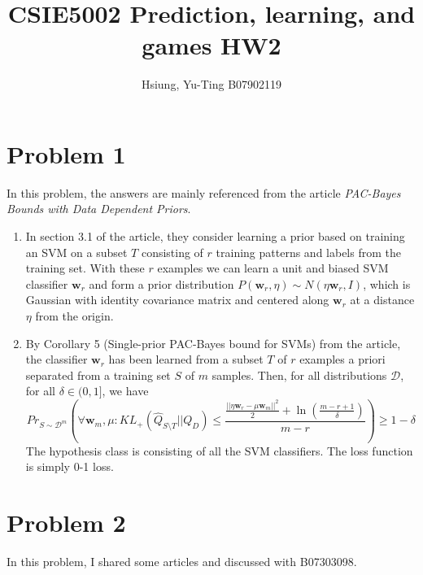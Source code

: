 \documentclass[a4paper, 12pt]{article}
\title{CSIE5002 Prediction, learning, and games HW2}
\author{Hsiung, Yu-Ting B07902119}
\begin{document}
\maketitle

\section*{Problem 1}

In this problem, the answers are mainly referenced from the article \textit{PAC-Bayes Bounds with Data Dependent Priors}\cite{parrado2012pac}.

\begin{enumerate}
  \item In section 3.1 of the article, they consider learning a prior based on training an SVM on a subset $T$ consisting of $r$ training patterns and labels from the training set. With these $r$ examples we can learn a unit and biased SVM classifier $\mathbf{w}_r$ and form a prior distribution $P(\mathbf{w}_r, \eta) \sim N(\eta \mathbf{w}_r, I)$, which is Gaussian with identity covariance matrix and centered along $\mathbf{w}_r$ at a distance $\eta$ from the origin.

  \item By Corollary 5 (Single-prior PAC-Bayes bound for SVMs) from the article, the classifier $\mathbf{w}_r$ has been learned from a subset $T$ of $r$ examples a priori separated from a training set $S$ of $m$ samples. Then, for all distributions $\mathcal{D}$, for
        all $\delta \in (0,1]$, we have
        \[Pr_{S \sim \mathcal{D}^m} \left( \forall \mathbf{w}_m, \mu: KL_+(\hat{Q}_{S\setminus T }|| Q_D) \leq \frac{\frac{||\eta \mathbf{w}_r - \mu \mathbf{w}_m||^2}{2}+\ln(\frac{m-r+1}{\delta})}{m-r}\right) \geq 1 - \delta\]
        The hypothesis class is consisting of all the SVM classifiers. The loss function is simply 0-1 loss.
\end{enumerate}

\section*{Problem 2}
In this problem, I shared some articles and discussed with B07303098.
\end{document}

